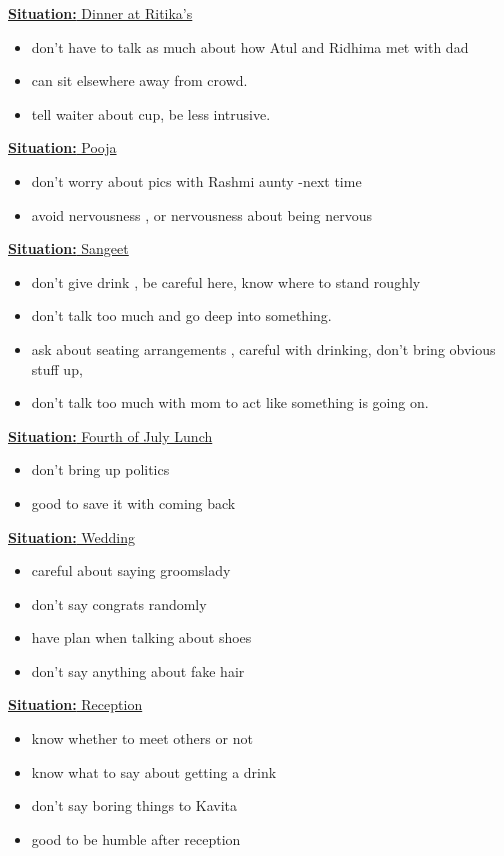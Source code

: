 \documentclass[11pt]{article}
\newcommand{\newSituation}[1]{\underline{\textbf{Situation:} #1} }
\begin{document}
\newSituation{Dinner at Ritika's}  
\begin{itemize}
\item don't have to talk as much about how Atul and Ridhima met with dad 
\item can sit elsewhere away from crowd. 
\item tell waiter about cup, be less intrusive.
\end{itemize}

\newSituation{Pooja}  
\begin{itemize} 
\item don't worry about pics with Rashmi aunty -next time 
\item avoid nervousness , or nervousness about being nervous 
\end{itemize} 



\newSituation{Sangeet}   
\begin{itemize}
\item don't give drink , be careful here, know where to stand roughly 
\item don't talk too much and go deep into something. 
\item ask about seating arrangements , careful with drinking, don't bring obvious stuff up, 
\item don't talk too much with mom to act like something is going on. 
\end{itemize}


\newSituation{Fourth of July Lunch} 
\begin{itemize} 
\item don't bring up politics 
\item good to save it with coming back 
\end{itemize}


\newSituation{Wedding} 
\begin{itemize}
\item careful about saying groomslady 
\item don't say congrats randomly 
\item have plan when talking about shoes 
\item don't say anything about fake hair 
\end{itemize}

\newSituation{Reception} 
\begin{itemize}
\item  know whether to meet others or not 
\item know what to say about getting a drink  
\item  don't say boring things to Kavita 
\item good to be humble after reception 
\end{itemize} 
\end{document}
